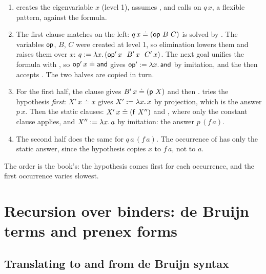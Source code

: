 \begin{tutorial}
\begin{enumerate}
  \item {} creates the eigenvariable $x$ (level 1), assumes ,
    and calls  on $q\,x$, a flexible pattern, against the formula.
  \item The first  clause matches  on the left: $q\,x\doteq(\mathsf{op}\ B\ C)$
    is solved by . The variables $\mathsf{op}$, $B$, $C$ were created at level 1, so
    elimination lowers them and raises them over $x$: $q:=\abs{x}{(\cst{op}'\,x\ \ B'\,x\ \ C'\,x)}$.
    The next goal unifies the formula  with , so $\mathsf{op}'\,x\doteq\mathsf{and}$
    gives $\mathsf{op}':=\lambda x.\,\mathsf{and}$ by imitation, and the  then accepts . The two
    halves are copied in turn.
  \item For the first half, the  clause gives $B'\,x\doteq(\mathsf{p}\ X)$ and then
    .  tries the hypothesis \emph{first}:
    $X'\,x\doteq x$ gives $X':=\lambda x.\,x$ by projection, which is the answer $p\,x$. Then the static
    clauses: $X'\,x\doteq(\cst{f}\ X'')$ and , where only the constant
     clause applies, and $X'':=\lambda x.\,a$ by imitation: the answer $p\,(f\,a)$.
  \item The second half does the same for $q\,a\,(f\,a)$. The occurrence of  has only the
    static answer, since the hypothesis copies $x$ to $f\,a$, not to $a$.
\end{enumerate}
The order is the book's: the hypothesis comes first for each occurrence, and the first occurrence
varies slowest.
\end{tutorial}

\section{Recursion over binders: de Bruijn terms and prenex forms}\label{sec:examples-binders}

\subsection{Translating to and from de Bruijn syntax}

